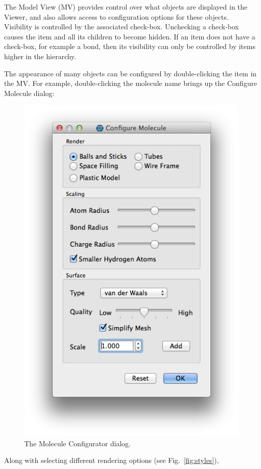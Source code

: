 \documentclass[a4paper,12pt]{article}
\begin{document}
The Model View (MV) provides control over what objects are displayed in the Viewer,
and also allows access to configuration options for these objects.  Visibility is
controlled by the associated check-box.  Unchecking a check-box causes the item
and all its children to become hidden.  If an item does not have a check-box,
for example a bond, then its visibility can only be controlled by items higher
in the hierarchy.  

The appearance of many objects can be configured by double-clicking the item in
the MV.  For example, double-clicking the molecule name brings up the Configure
Molecule dialog:
\begin{figure}[h]
\begin{center}
\includegraphics[scale=0.39]{figures/MoleculeConfigurator.png}
\caption{The Molecule Configurator dialog.}
\label{fig:config}
\end{center}
\end{figure}
Along with selecting different rendering options (see Fig.~\ref{fig:styles}),
\end{document}
